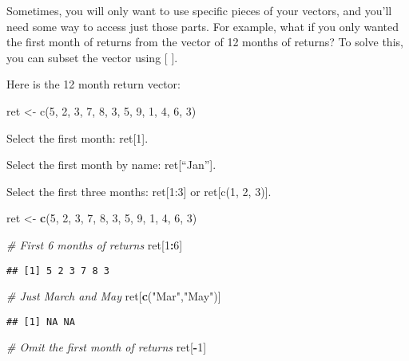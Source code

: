 \documentclass[]{article}
\newenvironment{Shaded}{\begin{snugshade}}{\end{snugshade}}
\newcommand{\KeywordTok}[1]{\textcolor[rgb]{0.13,0.29,0.53}{\textbf{#1}}}
\newcommand{\DecValTok}[1]{\textcolor[rgb]{0.00,0.00,0.81}{#1}}
\newcommand{\StringTok}[1]{\textcolor[rgb]{0.31,0.60,0.02}{#1}}
\newcommand{\CommentTok}[1]{\textcolor[rgb]{0.56,0.35,0.01}{\textit{#1}}}
\newcommand{\OperatorTok}[1]{\textcolor[rgb]{0.81,0.36,0.00}{\textbf{#1}}}
\newcommand{\NormalTok}[1]{#1}
\begin{document}
Sometimes, you will only want to use specific pieces of your vectors,
and you'll need some way to access just those parts. For example, what
if you only wanted the first month of returns from the vector of 12
months of returns? To solve this, you can subset the vector using {[}
{]}.

Here is the 12 month return vector:

ret \textless{}- c(5, 2, 3, 7, 8, 3, 5, 9, 1, 4, 6, 3)

Select the first month: ret{[}1{]}.

Select the first month by name: ret{[}``Jan''{]}.

Select the first three months: ret{[}1:3{]} or ret{[}c(1, 2, 3){]}.

\begin{Shaded}
\begin{Highlighting}[]
\NormalTok{ret <-}\StringTok{ }\KeywordTok{c}\NormalTok{(}\DecValTok{5}\NormalTok{, }\DecValTok{2}\NormalTok{, }\DecValTok{3}\NormalTok{, }\DecValTok{7}\NormalTok{, }\DecValTok{8}\NormalTok{, }\DecValTok{3}\NormalTok{, }\DecValTok{5}\NormalTok{, }\DecValTok{9}\NormalTok{, }\DecValTok{1}\NormalTok{, }\DecValTok{4}\NormalTok{, }\DecValTok{6}\NormalTok{, }\DecValTok{3}\NormalTok{)}

\CommentTok{# First 6 months of returns}
\NormalTok{ret[}\DecValTok{1}\OperatorTok{:}\DecValTok{6}\NormalTok{]}
\end{Highlighting}
\end{Shaded}

\begin{verbatim}
## [1] 5 2 3 7 8 3
\end{verbatim}

\begin{Shaded}
\begin{Highlighting}[]
\CommentTok{# Just March and May}
\NormalTok{ret[}\KeywordTok{c}\NormalTok{(}\StringTok{"Mar"}\NormalTok{,}\StringTok{"May"}\NormalTok{)]}
\end{Highlighting}
\end{Shaded}

\begin{verbatim}
## [1] NA NA
\end{verbatim}

\begin{Shaded}
\begin{Highlighting}[]
\CommentTok{# Omit the first month of returns}
\NormalTok{ret[}\OperatorTok{-}\DecValTok{1}\NormalTok{]}
\end{Highlighting}
\end{Shaded}
\end{document}

